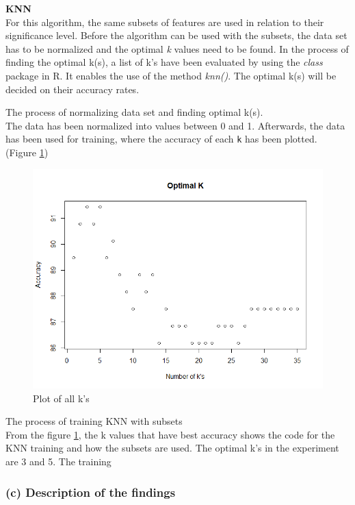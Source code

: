 \noindent
\textbf{KNN}\\
For this algorithm, the same subsets of features are used in relation to their significance level. Before the algorithm can be used with the subsets, the data set has to be normalized and the optimal \textit{k} values need to be found. In the process of finding the optimal k(s), a list of k's have been evaluated by using the \textit{class} package in R. It enables the use of the method \textit{knn()}. The optimal k(s) will be decided on their accuracy rates.

The process of normalizing data set and finding optimal k(s).\\
The data has been normalized into values between 0 and 1. Afterwards, the data has been used for training, where the accuracy of each \texttt{k} has been plotted. (Figure \ref{fig:optimal_ks})

\begin{figure}[H]
\centering
\includegraphics[scale=0.65]{Graphics/Assignment1/Rplot.png}
\caption{Plot of all k's}
\label{fig:optimal_ks}
\end{figure}

The process of training KNN with subsets \\
From the figure \ref{fig:optimal_ks}, the k values that have best accuracy 
 shows the code for the KNN training and how the subsets are used. The optimal k's in the experiment are 3 and 5. The training 




\subsubsection*{(c) Description of the findings}

